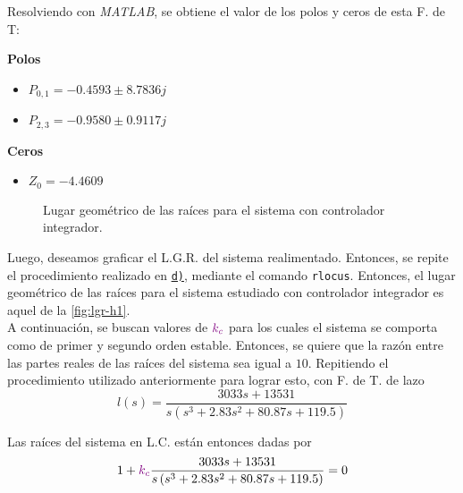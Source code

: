 Resolviendo con \textit{MATLAB}, se obtiene el valor de los polos y ceros de esta F. de T:

\begin{multicols}{2}
    \textbf{Polos}
    \begin{itemize}
        \item \(P_{0,1} = -0.4593 \pm 8.7836j\)
        \item \(P_{2,3} = -0.9580 \pm 0.9117j\)
    \end{itemize}

    \columnbreak

    \textbf{Ceros}
    \begin{itemize}
        \item \(Z_0 = -4.4609\)
    \end{itemize}
\end{multicols}

\begin{figure}[ht]
    \centering
    
    \caption{Lugar geométrico de las raíces para el sistema con controlador integrador.}
    \label{fig:lgr-h1}
\end{figure}

Luego, deseamos graficar el L.G.R. del sistema realimentado. Entonces, se repite
el procedimiento realizado en \hyperref[pregunta-d]{\texttt{d)}}, mediante el
comando \verb|rlocus|. Entonces, el lugar geométrico de las raíces para el sistema
estudiado con controlador integrador es aquel de la \autoref{fig:lgr-h1}. \\

A continuación, se buscan valores de $\mathbin{\color{violet}k_{c}}$ para los cuales el sistema se
comporta como de primer y segundo orden estable. Entonces, se quiere que la razón
entre las partes reales de las raíces del sistema sea igual a $10$. Repitiendo
el procedimiento utilizado anteriormente para lograr esto, con F. de T. de lazo
\begin{equation}
    l(s) = \frac{3033s + 13531}{s\left(s^{3} + 2.83s^{2} + 80.87s + 119.5\right)}
\end{equation}

Las raíces del sistema en L.C. están entonces dadas por
\begin{equation}
    1 + \mathbin{\color{violet}k_{c}}\frac{3033s + 13531}{s\left(s^{3} + 2.83s^{2} + 80.87s + 119.5\right)} = 0
\end{equation}

